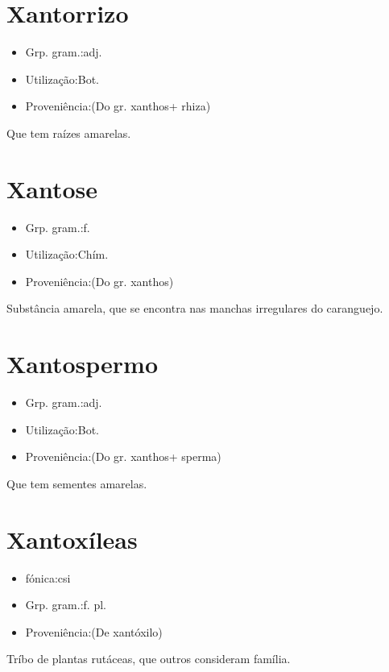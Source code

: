 \section{Xantorrizo}
\begin{itemize}
\item {Grp. gram.:adj.}
\end{itemize}
\begin{itemize}
\item {Utilização:Bot.}
\end{itemize}
\begin{itemize}
\item {Proveniência:(Do gr. \textunderscore xanthos\textunderscore  + \textunderscore rhiza\textunderscore )}
\end{itemize}
Que tem raízes amarelas.
\section{Xantose}
\begin{itemize}
\item {Grp. gram.:f.}
\end{itemize}
\begin{itemize}
\item {Utilização:Chím.}
\end{itemize}
\begin{itemize}
\item {Proveniência:(Do gr. \textunderscore xanthos\textunderscore )}
\end{itemize}
Substância amarela, que se encontra nas manchas irregulares do caranguejo.
\section{Xantospermo}
\begin{itemize}
\item {Grp. gram.:adj.}
\end{itemize}
\begin{itemize}
\item {Utilização:Bot.}
\end{itemize}
\begin{itemize}
\item {Proveniência:(Do gr. \textunderscore xanthos\textunderscore  + \textunderscore sperma\textunderscore )}
\end{itemize}
Que tem sementes amarelas.
\section{Xantoxíleas}
\begin{itemize}
\item {fónica:csi}
\end{itemize}
\begin{itemize}
\item {Grp. gram.:f. pl.}
\end{itemize}
\begin{itemize}
\item {Proveniência:(De \textunderscore xantóxilo\textunderscore )}
\end{itemize}
Tríbo de plantas rutáceas, que outros consideram família.
